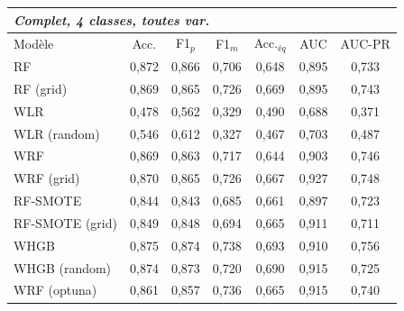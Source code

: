 \begin{tabular}{lcccccc}
\toprule
\multicolumn{7}{l}{\textit{Complet, 4 classes, toutes var.}} \\ \midrule
Modèle & Acc. & F1$_p$ & F1$_m$ & Acc.$_{éq}$ & AUC & AUC-PR \\
\midrule
RF & 0,872 & 0,866 & 0,706 & 0,648 & 0,895 & 0,733 \\
RF (grid) & 0,869 & 0,865 & 0,726 & 0,669 & 0,895 & 0,743 \\
WLR & 0,478 & 0,562 & 0,329 & 0,490 & 0,688 & 0,371 \\
WLR (random) & 0,546 & 0,612 & 0,327 & 0,467 & 0,703 & 0,487 \\
WRF & 0,869 & 0,863 & 0,717 & 0,644 & 0,903 & 0,746 \\
WRF (grid) & 0,870 & 0,865 & 0,726 & 0,667 & 0,927 & 0,748 \\
RF-SMOTE & 0,844 & 0,843 & 0,685 & 0,661 & 0,897 & 0,723 \\
RF-SMOTE (grid) & 0,849 & 0,848 & 0,694 & 0,665 & 0,911 & 0,711 \\
WHGB & 0,875 & 0,874 & 0,738 & 0,693 & 0,910 & 0,756 \\
WHGB (random) & 0,874 & 0,873 & 0,720 & 0,690 & 0,915 & 0,725 \\
WRF (optuna) & 0,861 & 0,857 & 0,736 & 0,665 & 0,915 & 0,740 \\
\bottomrule
\end{tabular}